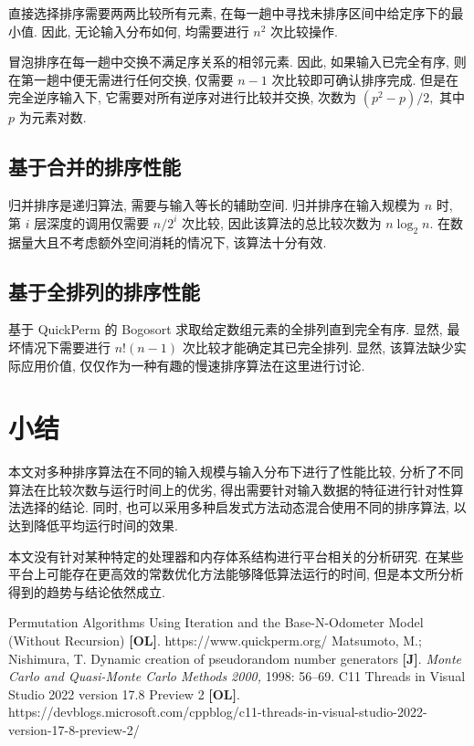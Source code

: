 \documentclass[12pt]{article}
\begin{document}
直接选择排序需要两两比较所有元素, 在每一趟中寻找未排序区间中给定序下的最小值. 因此, 无论输入分布如何, 均需要进行 $n^2$ 次比较操作.

冒泡排序在每一趟中交换不满足序关系的相邻元素. 因此, 如果输入已完全有序, 则在第一趟中便无需进行任何交换, 仅需要 $n - 1$ 次比较即可确认排序完成. 但是在完全逆序输入下, 它需要对所有逆序对进行比较并交换, 次数为 $(p^2 - p) / 2,$ 其中 $p$ 为元素对数.

\subsection{基于合并的排序性能}

归并排序是递归算法, 需要与输入等长的辅助空间. 归并排序在输入规模为 $n$ 时, 第 $i$ 层深度的调用仅需要 $n / 2^i$ 次比较, 因此该算法的总比较次数为 $n \log_2 n.$ 在数据量大且不考虑额外空间消耗的情况下, 该算法十分有效.

\subsection{基于全排列的排序性能}

基于 QuickPerm 的 Bogosort 求取给定数组元素的全排列直到完全有序. 显然, 最坏情况下需要进行 $n!(n-1)$ 次比较才能确定其已完全排列. 显然, 该算法缺少实际应用价值, 仅仅作为一种有趣的慢速排序算法在这里进行讨论.

\section{小结}

本文对多种排序算法在不同的输入规模与输入分布下进行了性能比较, 分析了不同算法在比较次数与运行时间上的优劣, 得出需要针对输入数据的特征进行针对性算法选择的结论. 同时, 也可以采用多种启发式方法动态混合使用不同的排序算法, 以达到降低平均运行时间的效果.

本文没有针对某种特定的处理器和内存体系结构进行平台相关的分析研究. 在某些平台上可能存在更高效的常数优化方法能够降低算法运行的时间, 但是本文所分析得到的趋势与结论依然成立.

\begin{thebibliography}{}

 Permutation Algorithms Using Iteration and the Base-N-Odometer Model (Without Recursion) \textbf{[OL]}. https://www.quickperm.org/
 Matsumoto, M.; Nishimura, T. Dynamic creation of pseudorandom number generators \textbf{[J]}. \textit{Monte Carlo and Quasi-Monte Carlo Methods 2000,} 1998: 56–69.
 C11 Threads in Visual Studio 2022 version 17.8 Preview 2 \textbf{[OL]}. https://devblogs.microsoft.com/cppblog/c11-threads-in-visual-studio-2022-version-17-8-preview-2/

\end{thebibliography}
\end{document}
